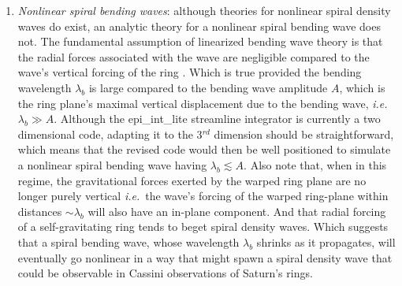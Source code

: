 \documentclass[preprint]{aastex62}
\begin{document}
\begin{enumerate}
\item {\it Nonlinear spiral bending waves}: although theories for nonlinear spiral density waves do exist, an
analytic theory for a nonlinear spiral bending wave does not. The fundamental assumption
of linearized bending wave theory is that the radial forces associated with the wave are negligible
compared to the wave's vertical forcing of the ring \citep{S84}. Which is true provided the bending wavelength
$\lambda_b$ is large compared to the bending wave amplitude $A$, which is the ring plane's maximal
vertical displacement due to the bending wave, {\it i.e.}\ $\lambda_b\gg A$.  
Although the epi\_int\_lite streamline integrator is 
currently a two dimensional code, adapting it to the 3$^{rd}$ dimension should be straightforward,
which means that the revised code would then be well positioned to simulate a nonlinear spiral bending wave having
$\lambda_b\lesssim A$. Also note that, when in this regime, the gravitational forces exerted by the
warped ring plane are no longer purely vertical {\it i.e.}\ the wave's forcing of the warped ring-plane
within distances $\sim\lambda_b$ will also have an in-plane component. And that radial forcing of a
self-gravitating ring tends to beget spiral density waves. Which suggests that
a spiral bending wave, whose wavelength $\lambda_b$ shrinks as it propagates, will
eventually go nonlinear in a way that might spawn a spiral density wave
that could be observable in Cassini observations of Saturn's rings.


\end{enumerate}
\end{document}
